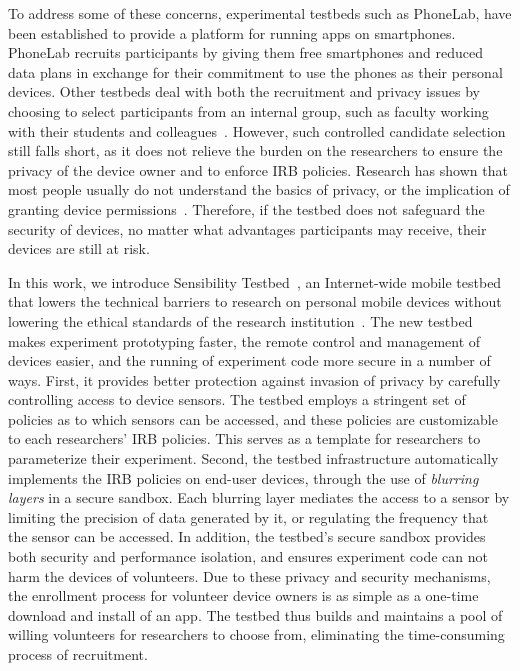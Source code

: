 To address some of these concerns, experimental testbeds such as
PhoneLab, have
been established to provide a platform for running apps on
smartphones. PhoneLab recruits participants by giving them free
smartphones and reduced data plans in exchange for their commitment to
use the phones as their personal devices. 
Other testbeds deal with both
the recruitment and privacy issues by choosing to select participants
from an internal group, such as faculty working with their students
and colleagues~\cite{hao2013isleep, wang2012no, wang2013sensing}. However,
such controlled candidate selection still falls short, as it does not 
relieve the burden on the researchers to ensure the privacy of the
device owner and to enforce IRB policies. 
Research has shown that most people usually do not understand 
the basics of privacy, or the implication of granting device
permissions~\cite{camp2015respecting}. Therefore, if the testbed does 
not safeguard the security of devices, no matter what 
advantages participants may receive, their devices are still at risk.

In this work, we introduce Sensibility Testbed~\cite{sensibility,
zhuang2015privacy}, an Internet-wide mobile testbed that 
lowers the technical barriers to research on personal mobile
devices without lowering the ethical standards of the research
institution~\cite{zevenbergen2013ethical}.  
The new testbed makes experiment prototyping faster, the remote
control and management of devices easier, and the running of
experiment code more secure in a number of ways. First, 
it provides better protection against invasion of privacy by carefully controlling
access to device sensors. The testbed employs a stringent set of
policies as to which sensors can be accessed, and these
policies are customizable to each researchers' IRB policies. This 
serves as a template for researchers to parameterize their 
experiment. Second, the testbed infrastructure automatically implements
the IRB policies on end-user devices, through the use of \textit{blurring 
layers} in a secure sandbox. Each blurring layer mediates the access to 
a sensor by limiting the precision of data generated by it, or 
regulating the frequency that the sensor can be accessed. In addition, 
the testbed's secure sandbox provides both security and performance 
isolation, and ensures experiment code can not harm the devices of 
volunteers. Due to these privacy and security mechanisms, 
the enrollment process for volunteer device owners is as
simple as a one-time download and install of an app. The testbed thus
builds and maintains a pool of willing volunteers for researchers to
choose from, eliminating the time-consuming process of recruitment.


